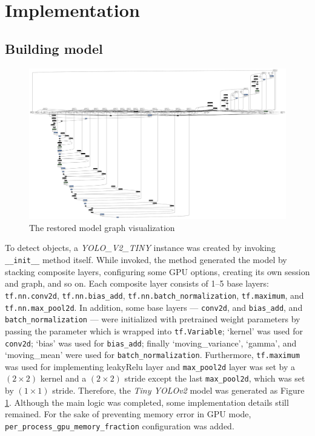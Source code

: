 \documentclass[a4paper,12pt]{article}
\begin{document}
\section{Implementation}


\subsection{Building model}

\begin{figure}[t]
	\centering
	\includegraphics[width=\textwidth]{./model}
	\caption{The restored model graph visualization}
	\label{figure:graph}
\end{figure}


To detect objects, a \emph{YOLO\_V2\_TINY} instance was created by invoking \lstinline{__init__} method itself. 
While invoked, the method generated the model by stacking composite layers, configuring some GPU options, creating its own session and graph, and so on. 
Each composite layer consists of 1--5 base layers: \lstinline{tf.nn.conv2d}, \lstinline{tf.nn.bias_add}, \lstinline{tf.nn.batch_normalization}, \lstinline{tf.maximum}, and \lstinline{tf.nn.max_pool2d}.
In addition, some base layers --- \lstinline{conv2d}, and \lstinline{bias_add}, and \lstinline{batch_normalization} --- were initialized with pretrained weight parameters by passing the parameter which is wrapped into \lstinline{tf.Variable};
‘kernel’ was used for \lstinline{conv2d}; 
‘bias’ was used for \lstinline{bias_add};
finally ‘moving\_variance’, ‘gamma’, and ‘moving\_mean’ were used for \lstinline{batch_normalization}. Furthermore, \lstinline{tf.maximum} was used for implementing leakyRelu layer and \lstinline{max_pool2d} layer was set by a $(2 \times 2)$ kernel and a $(2 \times 2)$ stride except the last \lstinline{max_pool2d}, which was set by $(1 \times 1)$ stride. Therefore, the \emph{Tiny YOLOv2} model was generated as Figure \ref{figure:graph}.
Although the main logic was completed, some implementation details still remained. For the sake of preventing memory error in GPU mode, \lstinline{per_process_gpu_memory_fraction} configuration was added.
\end{document}
